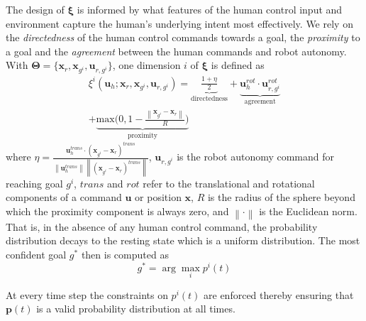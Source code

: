 \documentclass[natbib, twocolumn]{svjour3}          %
\newcommand{\argmax}{\arg\!\max}
\newcommand{\norm}[1]{\left\lVert#1\right\rVert}
\begin{document}
The design of $\boldsymbol{\xi}$ is informed by what features of the human control input and environment capture the human's underlying intent most effectively. We rely on the \textit{directedness} of the human control commands towards a goal, the \textit{proximity} to a goal and the \textit{agreement} between the human commands and robot autonomy. 
With $\boldsymbol{\Theta} = \{\boldsymbol{x}_r, \boldsymbol{x}_{g^i}, \boldsymbol{u}_{r, g^i}\}$, one dimension $i$ of $\boldsymbol{\xi}$ is defined as 
\begin{multline*}
\xi^i(\boldsymbol{u}_h;\boldsymbol{x}_r, \boldsymbol{x}_{g^i}, \boldsymbol{u}_{r, g^i}) = \underbrace{\frac{1 + \eta}{2}}_{\text{directedness}} + \underbrace{\boldsymbol{u}_{h}^{rot}\cdot\boldsymbol{u}_{r,g^i}^{rot}}_{\text{agreement}}
\\+ \underbrace{\text{max}\Big(0, 1-\frac{\norm{\boldsymbol{x}_{g^i} - \boldsymbol{x}_r}}{R}\Big)}_{\text{proximity}}
\end{multline*}
where  $\eta = \frac{\boldsymbol{u}_h^{trans}\cdot(\boldsymbol{x}_{g^i} - \boldsymbol{x}_r)^{trans}}{\norm{\boldsymbol{u}_h^{trans}}\norm{(\boldsymbol{x}_{g^i} - \boldsymbol{x}_r)^{trans}}}$, $\boldsymbol{u}_{r,g^i}$ is the robot autonomy command for reaching goal $g^i$, $trans$ and $rot$ refer to the translational and rotational components of a command $\boldsymbol{u}$ or position $\boldsymbol{x}$,  $R$ is the radius of the sphere beyond which the proximity component is always zero, and $\norm{\cdot}$ is the Euclidean norm. That is, in the absence of any human control command, the probability distribution decays to the resting state which is a uniform distribution.  
The most confident goal $g^*$ then is computed as 
\begin{equation}
g^* = \argmax_i  p^i(t)
\end{equation}

At every time step the constraints on $p^i(t)$ are enforced thereby ensuring that $\boldsymbol{p}(t)$ is a valid probability distribution at all times. 
	
\end{document}
